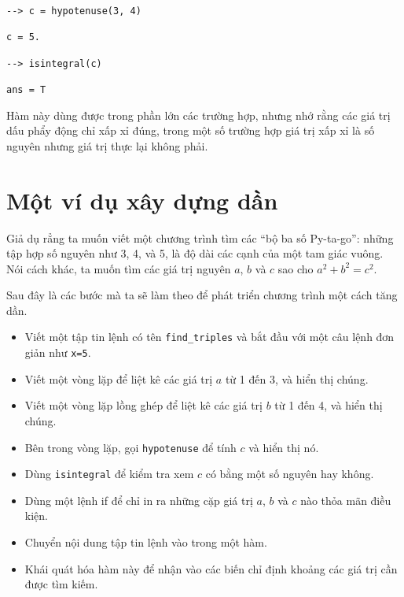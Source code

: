 \documentclass[12pt]{book}
\begin{document}
\begin{verbatim}
--> c = hypotenuse(3, 4)

c = 5.

--> isintegral(c)

ans = T
\end{verbatim}

Hàm này dùng được trong phần lớn các trường hợp, nhưng nhớ rằng
các giá trị dấu phẩy động chỉ xấp xỉ đúng, trong một số trường hợp
giá trị xấp xỉ là số nguyên nhưng giá trị thực lại không phải.


\section{Một ví dụ xây dựng dần}
\label{increxample}

Giả dụ rẳng ta muốn viết một chương trình tìm các ``bộ ba số
Py-ta-go'': những tập hợp số nguyên như 3, 4, và 5, là độ dài
các cạnh của một tam giác vuông. Nói cách khác, ta muốn tìm các
giá trị nguyên $a$, $b$ và $c$ sao cho $a^2 + b^2 = c^2$.

Sau đây là các bước mà ta sẽ làm theo để phát triển chương trình
một cách tăng dần.

\begin{itemize}

\item Viết một tập tin lệnh có tên \verb#find_triples# và bắt đầu
với một câu lệnh đơn giản như {\tt x=5}.

\item Viết một vòng lặp để liệt kê các giá trị $a$ từ 1 đến 3, và
hiển thị chúng.

\item Viết một vòng lặp lồng ghép để liệt kê các giá trị $b$ từ 1 đến 4,
và hiển thị chúng.

\item Bên trong vòng lặp, gọi {\tt hypotenuse} để tính $c$ và
hiển thị nó.

\item Dùng {\tt isintegral} để kiểm tra xem $c$ có bằng một số nguyên
hay không.

\item Dùng một lệnh if để chỉ in ra những cặp giá trị $a$, $b$ và $c$
nào thỏa mãn điều kiện.

\item Chuyển nội dung tập tin lệnh vào trong một hàm.

\item Khái quát hóa hàm này để nhận vào các biến chỉ định khoảng các
giá trị cần được tìm kiếm.

\end{itemize}
\end{document}
